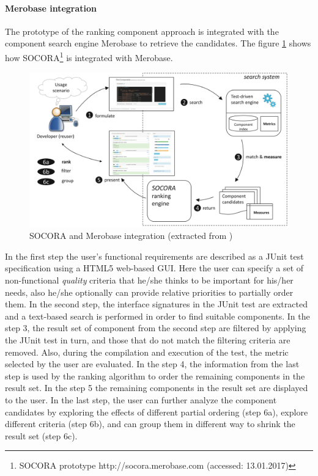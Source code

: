 \paragraph{Merobase integration}

The prototype of the ranking component approach is integrated with the component search engine Merobase to retrieve the candidates. The figure \ref{fig:socora-merobase} shows how SOCORA\footnote{SOCORA prototype http://socora.merobase.com (accessed: 13.01.2017)} is integrated with Merobase. 

\begin{figure}[ht]
	\centering
    \includegraphics[width=\textwidth]{grafiken/socora-merobase}
    \caption{SOCORA and Merobase integration (extracted from \cite{Kessel2016})}
    \label{fig:socora-merobase}
\end{figure}

In the first step the user's functional requirements are described as a JUnit test specification using a HTML5 web-based GUI. Here the user can specify a set of non-functional \textit{quality} criteria that he/she thinks to be important for his/her needs, also he/she optionally can provide relative priorities to partially order them. In the second step, the interface signatures in the JUnit test are extracted and a text-based search is performed in order to find suitable components. In the step 3, the result set of component from the second step are filtered by applying the JUnit test in turn, and those that do not match the filtering criteria are removed. Also, during the compilation and execution of the test, the metric selected by the user are evaluated. In the step 4, the information from the last step is used by the ranking algorithm to order the remaining components in the result set. In the step 5 the remaining components in the result set are displayed to the user. In the last step, the user can further analyze the component candidates by exploring the effects of different partial ordering (step 6a), explore different criteria (step 6b), and can group them in different way to shrink the result set (step 6c).